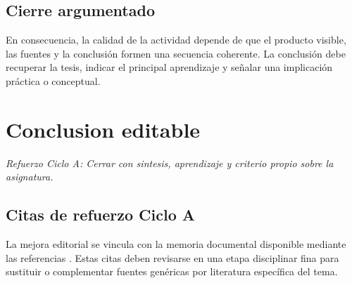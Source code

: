 \documentclass[
  spanish,
  letterpaper, oneside
]{article}
\begin{document}
\subsection*{Cierre argumentado}
En consecuencia, la calidad de la actividad depende de que el producto visible, las fuentes y la conclusión formen una secuencia coherente. La conclusión debe recuperar la tesis, indicar el principal aprendizaje y señalar una implicación práctica o conceptual.


\section{Conclusion editable}

\textit{Refuerzo Ciclo A: Cerrar con sintesis, aprendizaje y criterio propio sobre la asignatura.}

\clearpage
\nocite{unadmSitioWeb,unadmMallaDerecho2024}



\subsection*{Citas de refuerzo Ciclo A}
La mejora editorial se vincula con la memoria documental disponible mediante las referencias \citep{unadmSitioWeb,unadmMallaDerecho2024,cicloARefuerzo03,cicloARefuerzo04,cicloARefuerzo05,cicloARefuerzo06}. Estas citas deben revisarse en una etapa disciplinar fina para sustituir o complementar fuentes genéricas por literatura específica del tema.
\end{document}
